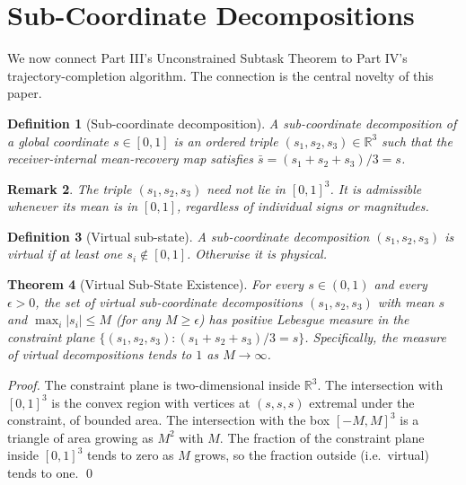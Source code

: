 \documentclass[twocolumn,a4paper]{article}
\newtheorem{theorem}{Theorem}[section]
\newtheorem{definition}[theorem]{Definition}
\newtheorem{remark}[theorem]{Remark}
\newcommand{\Real}{\mathbb{R}}
\begin{document}
\section{Sub-Coordinate Decompositions}
\label{sec:sub-coordinate}

We now connect Part III's Unconstrained Subtask Theorem to Part IV's trajectory-completion algorithm. The connection is the central novelty of this paper.

\begin{definition}[Sub-coordinate decomposition]
\label{def:sub-coord}
A \emph{sub-coordinate decomposition} of a global coordinate $s\in[0,1]$ is an ordered triple $(s_{1},s_{2},s_{3})\in\Real^{3}$ such that the receiver-internal mean-recovery map satisfies $\bar{s}=(s_{1}+s_{2}+s_{3})/3=s$.
\end{definition}

\begin{remark}
The triple $(s_{1},s_{2},s_{3})$ need not lie in $[0,1]^{3}$. It is admissible whenever its mean is in $[0,1]$, regardless of individual signs or magnitudes.
\end{remark}

\begin{definition}[Virtual sub-state]
\label{def:virtual-sub}
A sub-coordinate decomposition $(s_{1},s_{2},s_{3})$ is \emph{virtual} if at least one $s_{i}\notin[0,1]$. Otherwise it is \emph{physical}.
\end{definition}

\begin{theorem}[Virtual Sub-State Existence]
\label{thm:virtual-existence}
For every $s\in(0,1)$ and every $\epsilon>0$, the set of virtual sub-coordinate decompositions $(s_{1},s_{2},s_{3})$ with mean $s$ and $\max_{i}|s_{i}|\leq M$ (for any $M\geq\epsilon$) has positive Lebesgue measure in the constraint plane $\{(s_{1},s_{2},s_{3})\colon(s_{1}+s_{2}+s_{3})/3=s\}$. Specifically, the measure of virtual decompositions tends to $1$ as $M\to\infty$.
\end{theorem}

\begin{proof}
The constraint plane is two-dimensional inside $\Real^{3}$. The intersection with $[0,1]^{3}$ is the convex region with vertices at $(s,s,s)$ extremal under the constraint, of bounded area. The intersection with the box $[-M,M]^{3}$ is a triangle of area growing as $M^{2}$ with $M$. The fraction of the constraint plane inside $[0,1]^{3}$ tends to zero as $M$ grows, so the fraction outside (i.e.\ virtual) tends to one. \qed
\end{proof}
\end{document}
